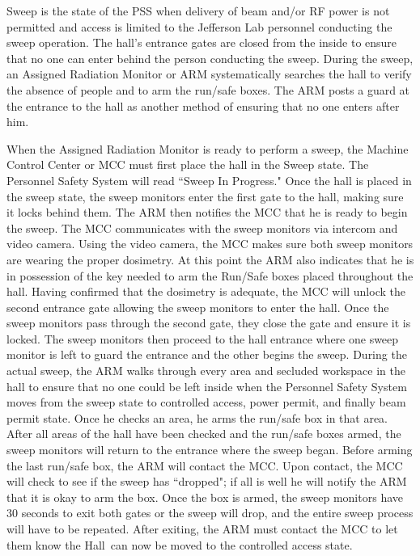 Sweep is the state of the PSS when delivery of beam and/or RF power is
not permitted and access is limited to the Jefferson Lab personnel
conducting the sweep operation.  The hall's entrance gates are closed
from the inside to ensure that no one can enter behind the person
conducting the sweep. During the sweep, an Assigned Radiation Monitor
or ARM systematically searches the hall to verify the absence of
people and to arm the run/safe boxes. The ARM posts a guard at the
entrance to the hall as another method of ensuring that no one enters
after him.
 
When the Assigned Radiation Monitor is ready to perform a sweep, the
Machine Control Center or MCC must first place the hall in the Sweep
state. The Personnel Safety System will read ``Sweep In Progress."
Once the hall is placed in the sweep state, the sweep monitors enter
the first gate to the hall, making sure it locks behind them. The ARM
then notifies the MCC that he is ready to begin the sweep. The MCC
communicates with the sweep monitors via intercom and video
camera. Using the video camera, the MCC makes sure both sweep monitors
are wearing the proper dosimetry. At this point the ARM also indicates
that he is in possession of the key needed to arm the Run/Safe boxes
placed throughout the hall.  Having confirmed that the dosimetry is
adequate, the MCC will unlock the second entrance gate allowing the
sweep monitors to enter the hall. Once the sweep monitors pass through
the second gate, they close the gate and ensure it is locked. The
sweep monitors then proceed to the hall entrance where one sweep
monitor is left to guard the entrance and the other begins the sweep.
During the actual sweep, the ARM walks through every area and secluded
workspace in the hall to ensure that no one could be left inside when
the Personnel Safety System moves from the sweep state to controlled
access, power permit, and finally beam permit state. Once he checks an
area, he arms the run/safe box in that area.  After all areas of the
hall have been checked and the run/safe boxes armed, the sweep
monitors will return to the entrance where the sweep began. Before
arming the last run/safe box, the ARM will contact the MCC. Upon
contact, the MCC will check to see if the sweep has ``dropped"; if all
is well he will notify the ARM that it is okay to arm the box. Once
the box is armed, the sweep monitors have 30 seconds to exit both
gates or the sweep will drop, and the entire sweep process will have
to be repeated. After exiting, the ARM must contact the MCC to let
them know the Hall~can now be moved to the controlled access state.
 
